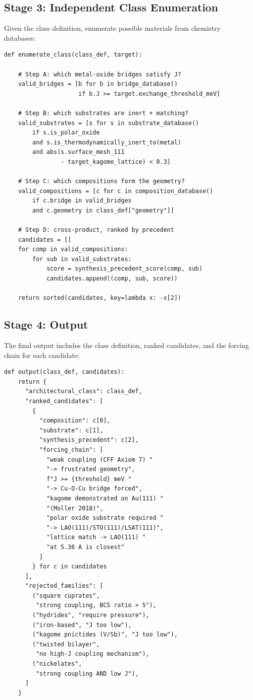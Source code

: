 \documentclass[11pt, a4paper]{article}
\begin{document}
\subsection{Stage 3: Independent Class Enumeration}

Given the class definition, enumerate possible materials from
chemistry databases:

\begin{lstlisting}
def enumerate_class(class_def, target):

    # Step A: which metal-oxide bridges satisfy J?
    valid_bridges = [b for b in bridge_database()
                     if b.J >= target.exchange_threshold_meV]

    # Step B: which substrates are inert + matching?
    valid_substrates = [s for s in substrate_database()
        if s.is_polar_oxide
        and s.is_thermodynamically_inert_to(metal)
        and abs(s.surface_mesh_111
                - target_kagome_lattice) < 0.3]

    # Step C: which compositions form the geometry?
    valid_compositions = [c for c in composition_database()
        if c.bridge in valid_bridges
        and c.geometry in class_def["geometry"]]

    # Step D: cross-product, ranked by precedent
    candidates = []
    for comp in valid_compositions:
        for sub in valid_substrates:
            score = synthesis_precedent_score(comp, sub)
            candidates.append((comp, sub, score))

    return sorted(candidates, key=lambda x: -x[2])
\end{lstlisting}

\subsection{Stage 4: Output}

The final output includes the class definition, ranked candidates,
and the forcing chain for each candidate:

\begin{lstlisting}
def output(class_def, candidates):
    return {
      "architectural_class": class_def,
      "ranked_candidates": [
        {
          "composition": c[0],
          "substrate": c[1],
          "synthesis_precedent": c[2],
          "forcing_chain": [
            "weak coupling (CFF Axiom 7) "
            "-> frustrated geometry",
            f"J >= {threshold} meV "
            "-> Cu-O-Cu bridge forced",
            "kagome demonstrated on Au(111) "
            "(Moller 2018)",
            "polar oxide substrate required "
            "-> LAO(111)/STO(111)/LSAT(111)",
            "lattice match -> LAO(111) "
            "at 5.36 A is closest"
          ]
        } for c in candidates
      ],
      "rejected_families": [
        ("square cuprates",
         "strong coupling, BCS ratio > 5"),
        ("hydrides", "require pressure"),
        ("iron-based", "J too low"),
        ("kagome pnictides (V/Sb)", "J too low"),
        ("twisted bilayer",
         "no high-J coupling mechanism"),
        ("nickelates",
         "strong coupling AND low J"),
      ]
    }
\end{lstlisting}
\end{document}
